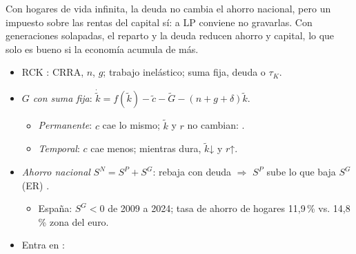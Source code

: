 \documentclass{article}
\begin{document}
\begin{columnas}
\begin{ideaclave}
Con hogares de vida infinita, la deuda no cambia el ahorro nacional, pero un impuesto sobre las rentas del capital sí: a LP conviene no gravarlas. Con generaciones solapadas, el reparto y la deuda reducen ahorro y capital, lo que solo es bueno si la economía acumula de más.
\end{ideaclave}

\begin{itemize}
\item RCK : CRRA, $n$, $g$; trabajo inelástico; suma fija, deuda o $\tau_K$.
\item \emph{$G$ con suma fija}: $\dot{\tilde k}=f(\tilde k)-\tilde c-\tilde G-(n+g+\delta)\tilde k$.
  \begin{itemize}
  \item \emph{Permanente}: $c$ cae lo mismo; $\tilde k$ y $r$ no cambian: .
  \item \emph{Temporal}: $c$ cae menos; mientras dura, $\tilde k$↓ y $r$↑.
  \end{itemize}
\end{itemize}
\begin{itemize}
\item \emph{Ahorro nacional} $S^N=S^P+S^G$: rebaja con deuda $\Rightarrow$ $S^P$ sube lo que baja $S^G$ (ER) .
  \begin{itemize}
  \item España: $S^G<0$ de 2009 a 2024; tasa de ahorro de hogares 11,9\,\% vs. 14,8\,\% zona del euro.
  \end{itemize}
\end{itemize}
\begin{itemize}
\item Entra en :
  \begin{itemize}

\end{itemize}
\end{itemize}
\end{columnas}
\end{document}
